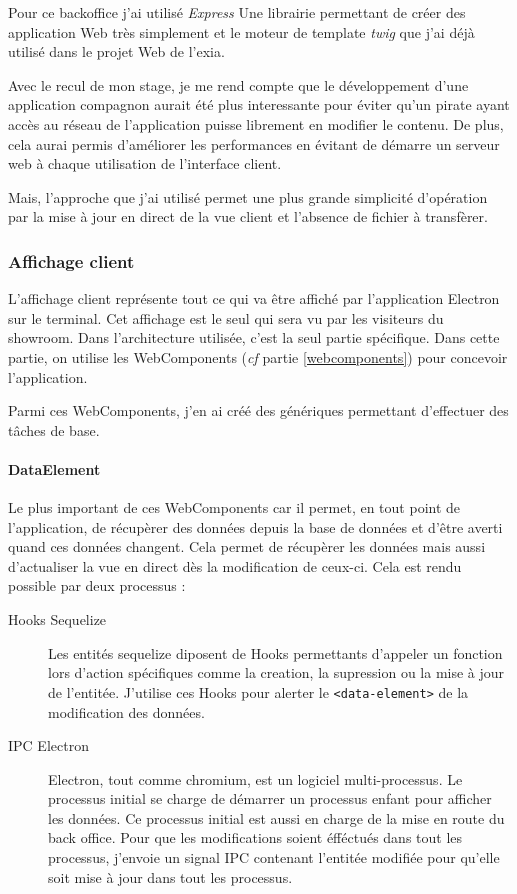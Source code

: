 Pour ce backoffice j'ai utilisé \emph{Express} Une librairie permettant de créer des application Web très simplement et le moteur de template \emph{twig} que j'ai déjà utilisé dans le projet Web de l'exia.

\bigskip

Avec le recul de mon stage, je me rend compte que le développement d'une application compagnon aurait été plus interessante pour éviter qu'un pirate ayant accès au réseau de l'application puisse librement en modifier le contenu.
De plus, cela aurai permis d'améliorer les performances en évitant de démarre un serveur web à chaque utilisation de l'interface client.

Mais, l'approche que j'ai utilisé permet une plus grande simplicité d'opération par la mise à jour en direct de la vue client et l'absence de fichier à transfèrer.

\subsubsection{Affichage client}

 L'affichage client représente tout ce qui va être affiché par l'application Electron sur le terminal.
Cet affichage est le seul qui sera vu par les visiteurs du showroom.
Dans l'architecture utilisée, c'est la seul partie spécifique.
Dans cette partie, on utilise les WebComponents (\emph{cf} partie \ref{webcomponents}) pour concevoir l'application.

Parmi ces WebComponents, j'en ai créé des génériques permettant d'effectuer des tâches de base.


\paragraph{DataElement} Le plus important de ces WebComponents car il permet, en tout point de l'application, de récupèrer des données depuis la base de données et d'être averti quand ces données changent.
Cela permet de récupèrer les données mais aussi d'actualiser la vue en direct dès la modification de ceux-ci.
Cela est rendu possible par deux processus :
\begin{description}
    \item[Hooks Sequelize] Les entités sequelize diposent de Hooks permettants d'appeler un fonction lors d'action spécifiques comme la creation, la supression ou la mise à jour de l'entitée. J'utilise ces Hooks pour alerter le \texttt{<data-element>} de la modification des données.
    \item[IPC Electron] Electron, tout comme chromium, est un logiciel multi-processus. Le processus initial se charge de démarrer un processus enfant pour afficher les données. Ce processus initial est aussi en charge de la mise en route du back office. Pour que les modifications soient éfféctués dans tout les processus, j'envoie un signal IPC contenant l'entitée modifiée pour qu'elle soit mise à jour dans tout les processus.
\end{description}


